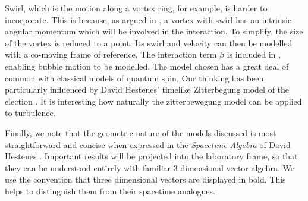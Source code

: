 Swirl, which is  the motion along a vortex ring, for example, is harder to incorporate.
This is because, as argued in , a vortex with swirl has an intrinsic angular momentum
which will be involved in the interaction.
To simplify, the size of the vortex is reduced to a point.
Its swirl and velocity can then be modelled with a co-moving frame of reference,
The interaction term $\beta$ is included in ,  enabling bubble motion to be modelled.
The model chosen has a great deal of common with classical models of quantum  spin.
Our thinking has been particularly influenced by David Hestenes' timelike  Zitterbegung model of the election \cite{Hestenes1973, Hestenes1990, HestenesResearchProgram}.  
It is interesting how naturally the zitterbewegung model can be applied to turbulence.

Finally, we note that the geometric nature of the models discussed is most straightforward
and  concise when expressed in the {\em Spacetime Algebra} of David Hestenes \cite{Hestenes2003}.
Important results will be projected into the laboratory frame,
so that they can be understood entirely with familiar 3-dimensional vector algebra.
We use the convention that three dimensional vectors are displayed in bold.
This helps to distinguish them from their spacetime analogues.







 



